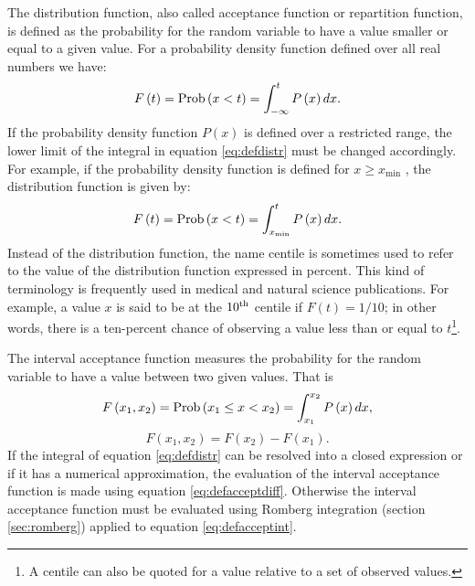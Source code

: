 The distribution function, also called acceptance function or
repartition function, is defined as the probability for the random
variable to have a value smaller or equal to a given value. For a
probability density function defined over all real numbers we
have:
\begin{equation}
\label{eq:defdistr}
  F\left(t\right)=\mathop{\textrm{Prob}}\left(x<t\right)=\int_{-\infty}^t P\left(x\right)
  dx.
\end{equation}
If the probability density function $P\left(x\right)$ is defined
over a restricted range, the lower limit of the integral in
equation \ref{eq:defdistr} must be changed accordingly. For
example, if the probability density function is defined for $x\geq
x_{\min}$ , the distribution function is given by:
\begin{equation}
\label{eq:defdistrmin}
  F\left(t\right)=\mathop{\textrm{Prob}}\left(x<t\right)=\int_{x_{\min}}^t P\left(x\right)
  dx.
\end{equation}
Instead of the distribution function,  the name centile is
sometimes used to refer to the value of the distribution function
expressed in percent. This kind of terminology is frequently used
in medical and natural science publications. For example, a value
$x$ is said to be at the $10^{\mathop{\rm th}}$ centile if
$F\left(t\right)=1/10$; in other words, there is a ten-percent
chance of observing a value less than or equal to $t$\footnote{A
centile can also be quoted for a value relative to a set of
observed values.}.

The interval acceptance function measures the probability for the
random variable to have a value between two given values. That is
\begin{equation}
\label{eq:defacceptint}
  F\left(x_1,x_2\right)=\mathop{\textrm{Prob}}\left(x_1\le x<x_2\right)
  =\int_{x_1}^{x_2} P\left(x\right)dx,
\end{equation}
\begin{equation}
\label{eq:defacceptdiff}
  F\left(x_1,x_2\right)=F\left(x_2\right)-F\left(x_1\right).
\end{equation}
If the integral of equation \ref{eq:defdistr} can be resolved into
a closed expression or if it has a numerical approximation, the
evaluation of the interval acceptance function is made using
equation \ref{eq:defacceptdiff}. Otherwise the interval acceptance
function must be evaluated using Romberg integration (\cf section
\ref{sec:romberg}) applied to equation \ref{eq:defacceptint}.

